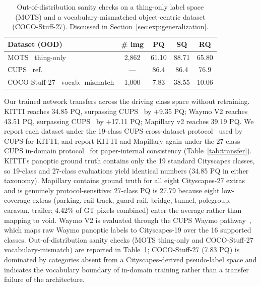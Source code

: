 \documentclass{article}
\begin{document}
\begin{table}[tbp]
\caption{Out-of-distribution sanity checks on a thing-only label space (MOTS) and a vocabulary-mismatched object-centric dataset (COCO-Stuff-27). Discussed in Section~\ref{sec:exp:generalization}.}
\label{tab:cocooo}
\centering
\footnotesize
\setlength{\tabcolsep}{3pt}
\begin{tabular}{l c c c c}
\toprule
Dataset (OOD) & \# img & PQ & SQ & RQ \\
\midrule
MOTS~\cite{voigtlaender2019mots} thing-only & 2{,}862 & 61.10 & 88.71 & 65.80 \\
\quad CUPS~\cite{hahn2025cups} ref. & --- & 86.4 & 86.4 & 76.9 \\
COCO-Stuff-27~\cite{caesar2018coco} vocab.\ mismatch & 1{,}000 & \phantom{0}7.83 & 38.55 & 10.06 \\
\bottomrule
\end{tabular}
\end{table}

Our trained network transfers across the driving class space without retraining. KITTI reaches 34.85 PQ, surpassing CUPS~\cite{hahn2025cups} by $+$9.35 PQ; Waymo V2 reaches 43.51 PQ, surpassing CUPS~\cite{hahn2025cups} by $+$17.11 PQ; Mapillary v2 reaches 39.19 PQ. We report each dataset under the 19-class CUPS cross-dataset protocol~\cite{hahn2025cups} used by CUPS for KITTI, and report KITTI and Mapillary again under the 27-class CUPS in-domain protocol~\cite{hahn2025cups} for paper-internal consistency (Table~\ref{tab:transfer}). KITTI's panoptic ground truth contains only the 19 standard Cityscapes classes, so 19-class and 27-class evaluations yield identical numbers (34.85 PQ in either taxonomy). Mapillary contains ground truth for all eight Cityscapes-27 extras and is genuinely protocol-sensitive: 27-class PQ is 27.79 because eight low-coverage extras (parking, rail track, guard rail, bridge, tunnel, polegroup, caravan, trailer; 4.42\% of GT pixels combined) enter the average rather than mapping to void. Waymo V2 is evaluated through the CUPS Waymo pathway~\cite{hahn2025cups}, which maps raw Waymo panoptic labels to Cityscapes-19 over the 16 supported classes. Out-of-distribution sanity checks (MOTS thing-only and COCO-Stuff-27 vocabulary-mismatch) are reported in Table~\ref{tab:cocooo}; COCO-Stuff-27 (7.83 PQ) is dominated by categories absent from a Cityscapes-derived pseudo-label space and indicates the vocabulary boundary of in-domain training rather than a transfer failure of the architecture.
\end{document}
